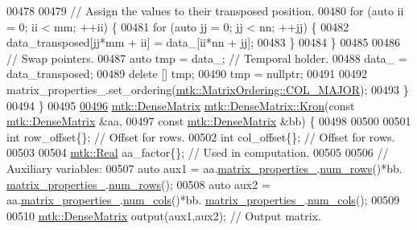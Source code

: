 \begin{DoxyCode}
00478 
00479     \textcolor{comment}{// Assign the values to their transposed position.}
00480     \textcolor{keywordflow}{for} (\textcolor{keyword}{auto} ii = 0; ii < mm; ++ii) \{
00481       \textcolor{keywordflow}{for} (\textcolor{keyword}{auto} jj = 0; jj < nn; ++jj) \{
00482         data\_transposed[jj*mm + ii] = data\_[ii*nn + jj];
00483       \}
00484     \}
00485 
00486     \textcolor{comment}{// Swap pointers.}
00487     \textcolor{keyword}{auto} tmp = data\_; \textcolor{comment}{// Temporal holder.}
00488     data\_ = data\_transposed;
00489     \textcolor{keyword}{delete} [] tmp;
00490     tmp = \textcolor{keyword}{nullptr};
00491 
00492     matrix\_properties\_.set\_ordering(\hyperlink{namespacemtk_ga622801bd9f912d0f976c3e383f5f581ca34d2765ffc490951febdcca04bc4f7cd}{mtk::MatrixOrdering::COL\_MAJOR});
00493   \}
00494 \}
00495 
\hypertarget{mtk__dense__matrix_8cc_source_l00496}{}\hyperlink{classmtk_1_1DenseMatrix_a01d3d8bd502870f93bf3a88a0cc5fb49}{00496} \hyperlink{classmtk_1_1DenseMatrix}{mtk::DenseMatrix} \hyperlink{classmtk_1_1DenseMatrix_a01d3d8bd502870f93bf3a88a0cc5fb49}{mtk::DenseMatrix::Kron}(\textcolor{keyword}{const} 
      \hyperlink{classmtk_1_1DenseMatrix}{mtk::DenseMatrix} &aa,
00497                                         \textcolor{keyword}{const} \hyperlink{classmtk_1_1DenseMatrix}{mtk::DenseMatrix} &bb) \{
00498 
00500 
00501   \textcolor{keywordtype}{int} row\_offset\{\}; \textcolor{comment}{// Offset for rows.}
00502   \textcolor{keywordtype}{int} col\_offset\{\}; \textcolor{comment}{// Offset for rows.}
00503 
00504   \hyperlink{group__c01-roots_gac080bbbf5cbb5502c9f00405f894857d}{mtk::Real} aa\_factor\{\};    \textcolor{comment}{// Used in computation.}
00505 
00506   \textcolor{comment}{// Auxiliary variables:}
00507   \textcolor{keyword}{auto} aux1 = aa.\hyperlink{classmtk_1_1DenseMatrix_a481c8d09af685a5ba67acefdcaa810cc}{matrix\_properties\_}.\hyperlink{classmtk_1_1Matrix_ab308b25b48e4fcd39fc60e0c3fc66dea}{num\_rows}()*bb.
      \hyperlink{classmtk_1_1DenseMatrix_a481c8d09af685a5ba67acefdcaa810cc}{matrix\_properties\_}.\hyperlink{classmtk_1_1Matrix_ab308b25b48e4fcd39fc60e0c3fc66dea}{num\_rows}();
00508   \textcolor{keyword}{auto} aux2 = aa.\hyperlink{classmtk_1_1DenseMatrix_a481c8d09af685a5ba67acefdcaa810cc}{matrix\_properties\_}.\hyperlink{classmtk_1_1Matrix_a2160118d0edf51cf2aaa806ee1b915f8}{num\_cols}()*bb.
      \hyperlink{classmtk_1_1DenseMatrix_a481c8d09af685a5ba67acefdcaa810cc}{matrix\_properties\_}.\hyperlink{classmtk_1_1Matrix_a2160118d0edf51cf2aaa806ee1b915f8}{num\_cols}();
00509 
00510   \hyperlink{classmtk_1_1DenseMatrix}{mtk::DenseMatrix} output(aux1,aux2); \textcolor{comment}{// Output matrix.}

\end{DoxyCode}
